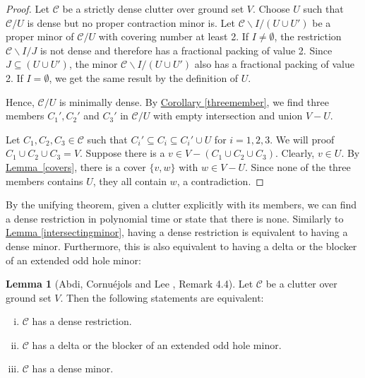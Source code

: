 \documentclass[a4paper, 12pt]{scrbook}
\theoremstyle{definition}
\newtheorem{lemma}[theorem]{Lemma}
\begin{document}
   \begin{proof}
       Let $\mathcal{C}$ be a strictly dense clutter over ground set $V$.
       Choose $U$ such that $\mathcal{C} / U$ is dense but no proper contraction minor is.
       Let $\mathcal{C} \backslash I / (U \cup U')$ be a proper minor of $\mathcal{C} /U$ with covering number at least 2.
       If $I \neq \emptyset$, the restriction $\mathcal{C} \backslash I / J$ is not dense and therefore has a fractional packing of value 2.
       Since $J \subseteq (U \cup U')$, the minor $\mathcal{C} \backslash I / (U \cup U')$ also has a fractional packing of value 2.
       If $I=\emptyset$, we get the same result by the definition of $U$.

       Hence, $\mathcal{C}/U$ is minimally dense.
       By \hyperref[threemember]{Corollary \ref*{threemember}}, we find three members $C_1', C_2'$ and $C_3'$ in $\mathcal{C}/U$ with empty intersection and union $V - U$.

       Let $C_1, C_2, C_3 \in \mathcal{C}$ such that $C_i' \subseteq C_i \subseteq C_i' \cup U$ for $i=1,2,3$.
       We will proof $C_1 \cup C_2 \cup C_3 = V$.
       Suppose there is a $v \in V-(C_1 \cup C_2 \cup C_3)$.
       Clearly, $v \in U$.
       By \hyperref[covers]{Lemma~\ref*{covers}}, there is a cover $\{v,w\}$ with $w \in V-U$.
       Since none of the three members contains $U$, they all contain $w$, a contradiction.
   \end{proof}

   By the unifying theorem, given a clutter explicitly with its members, we can find a dense restriction in polynomial time or state that there is none. Similarly to \hyperref[intersectingminor]{Lemma \ref*{intersectingminor}}, having a dense restriction is equivalent to having a dense minor. Furthermore, this is also equivalent to having a delta or the blocker of an extended odd hole minor:
   \begin{lemma}[Abdi, Cornuéjols and Lee \cite{restrictions}, Remark 4.4]
       Let $\mathcal{C}$ be a clutter over ground set $V$. Then the following statements are equivalent:
       \leavevmode
       \begin{enumerate}[(i)]
           \item $\mathcal{C}$ has a dense restriction.
           \item $\mathcal{C}$ has a delta or the blocker of an extended odd hole minor.
           \item $\mathcal{C}$ has a dense minor.
       \end{enumerate}
   \end{lemma}
\end{document}
